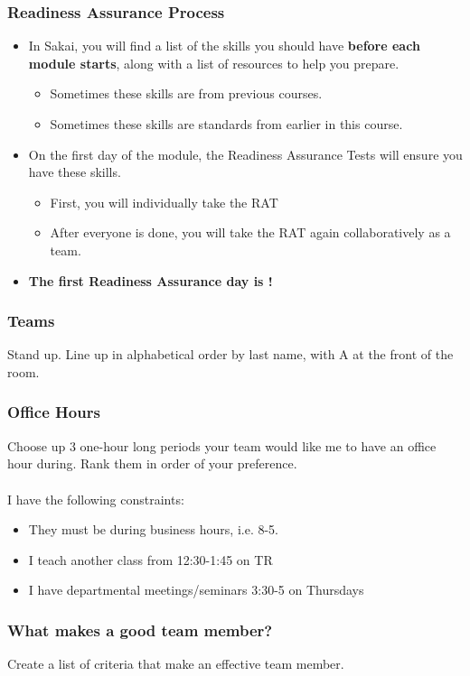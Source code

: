 \documentclass{beamer}
\begin{document}
\begin{frame}\frametitle{Readiness Assurance Process}
\begin{itemize}
\item In Sakai, you will find a list of the skills you should have {\bf before each module starts}, along with a list of resources to help you prepare.
\begin{itemize}
\item Sometimes these skills are from previous courses.
\item Sometimes these skills are standards from earlier in this course.
\end{itemize}
\pause \item On the first day of the module, the Readiness Assurance Tests will ensure you have these skills.
\begin{itemize}
\item First, you will individually take the RAT
\item After everyone is done, you will take the RAT again collaboratively as a team.
\end{itemize}
\item {\bf The first Readiness Assurance day is !}
\end{itemize}
\end{frame}

\begin{frame}\frametitle{Teams}
Stand up.  Line up in alphabetical order by last name, with A at the front of the room.
\vspace{4in}
\end{frame}

\begin{frame}\frametitle{Office Hours}
Choose up 3 one-hour long periods your team would like me to have an office hour during.  Rank them in order of your preference.\\
\ \\

I have the following constraints:
\begin{itemize}
\item They must be during business hours, i.e. 8-5.
\item I teach another class from 12:30-1:45 on TR
\item I have departmental meetings/seminars 3:30-5 on Thursdays
\end{itemize}
\end{frame}

\begin{frame} \frametitle{What makes a good team member?}
Create a list of criteria that make an effective team member.
\vspace{4in}
\end{frame}
\end{document}
